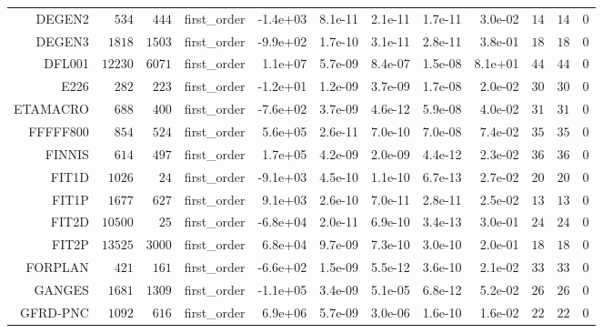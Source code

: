 \begin{longtable}{rrrrrrrrrrrr}
  DEGEN2 & \(   534\) & \(   444\) & first\_order & -1.4e+03 &  8.1e-11 &  2.1e-11 &  1.7e-11 &  3.0e-02 & \(    14\) & \(    14\) & \(     0\) \\
  DEGEN3 & \(  1818\) & \(  1503\) & first\_order & -9.9e+02 &  1.7e-10 &  3.1e-11 &  2.8e-11 &  3.8e-01 & \(    18\) & \(    18\) & \(     0\) \\
  DFL001 & \( 12230\) & \(  6071\) & first\_order &  1.1e+07 &  5.7e-09 &  8.4e-07 &  1.5e-08 &  8.1e+01 & \(    44\) & \(    44\) & \(     0\) \\
  E226 & \(   282\) & \(   223\) & first\_order & -1.2e+01 &  1.2e-09 &  3.7e-09 &  1.7e-08 &  2.0e-02 & \(    30\) & \(    30\) & \(     0\) \\
  ETAMACRO & \(   688\) & \(   400\) & first\_order & -7.6e+02 &  3.7e-09 &  4.6e-12 &  5.9e-08 &  4.0e-02 & \(    31\) & \(    31\) & \(     0\) \\
  FFFFF800 & \(   854\) & \(   524\) & first\_order &  5.6e+05 &  2.6e-11 &  7.0e-10 &  7.0e-08 &  7.4e-02 & \(    35\) & \(    35\) & \(     0\) \\
  FINNIS & \(   614\) & \(   497\) & first\_order &  1.7e+05 &  4.2e-09 &  2.0e-09 &  4.4e-12 &  2.3e-02 & \(    36\) & \(    36\) & \(     0\) \\
  FIT1D & \(  1026\) & \(    24\) & first\_order & -9.1e+03 &  4.5e-10 &  1.1e-10 &  6.7e-13 &  2.7e-02 & \(    20\) & \(    20\) & \(     0\) \\
  FIT1P & \(  1677\) & \(   627\) & first\_order &  9.1e+03 &  2.6e-10 &  7.0e-11 &  2.8e-11 &  2.5e-02 & \(    13\) & \(    13\) & \(     0\) \\
  FIT2D & \( 10500\) & \(    25\) & first\_order & -6.8e+04 &  2.0e-11 &  6.9e-10 &  3.4e-13 &  3.0e-01 & \(    24\) & \(    24\) & \(     0\) \\
  FIT2P & \( 13525\) & \(  3000\) & first\_order &  6.8e+04 &  9.7e-09 &  7.3e-10 &  3.0e-10 &  2.0e-01 & \(    18\) & \(    18\) & \(     0\) \\
  FORPLAN & \(   421\) & \(   161\) & first\_order & -6.6e+02 &  1.5e-09 &  5.5e-12 &  3.6e-10 &  2.1e-02 & \(    33\) & \(    33\) & \(     0\) \\
  GANGES & \(  1681\) & \(  1309\) & first\_order & -1.1e+05 &  3.4e-09 &  5.1e-05 &  6.8e-12 &  5.2e-02 & \(    26\) & \(    26\) & \(     0\) \\
  GFRD-PNC & \(  1092\) & \(   616\) & first\_order &  6.9e+06 &  5.7e-09 &  3.0e-06 &  1.6e-10 &  1.6e-02 & \(    22\) & \(    22\) & \(     0\) \\

\end{longtable}
